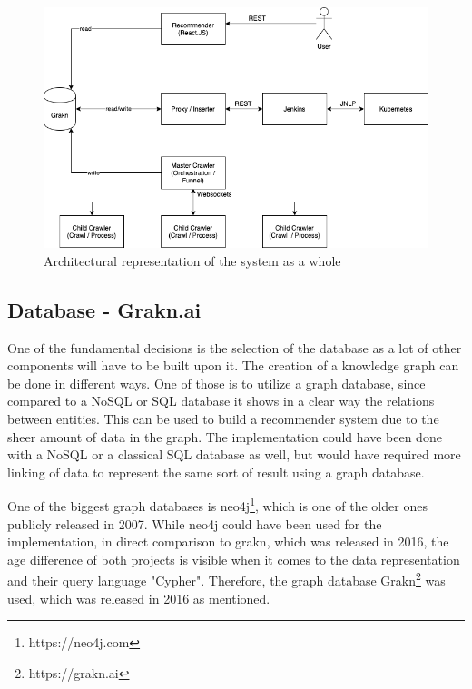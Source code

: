 \begin{figure}[H]
    \centering
    \includegraphics[scale=0.5]{graphics/architecture_v2.png}
    \caption{Architectural representation of the system as a whole}
    \label{fig:architecture}
\end{figure}

\subsection{Database - Grakn.ai}
\label{sec:database}
One of the fundamental decisions is the selection of the database as a lot of other components will have to be built upon it. The creation of a knowledge graph can be done in different ways. One of those is to utilize a graph database, since compared to a NoSQL or SQL database it shows in a clear way the relations between entities. This can be used to build a recommender system due to the sheer amount of data in the graph. The implementation could have been done with a NoSQL or a classical SQL database as well, but would have required more linking of data to represent the same sort of result using a graph database.


One of the biggest graph databases is neo4j\footnote{https://neo4j.com}, which is one of the older ones publicly released in 2007. While neo4j could have been used for the implementation, in direct comparison to grakn, which was released in 2016, the age difference of both projects is visible when it comes to the data representation and their query language "Cypher". Therefore, the graph database Grakn\footnote{https://grakn.ai} was used, which was released in 2016 as mentioned.

